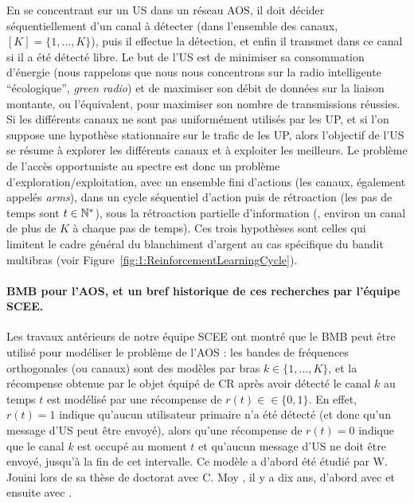\begin{resume_fr}
En se concentrant sur un US dans un réseau AOS, il doit décider séquentiellement d'un canal à détecter (dans l'ensemble des canaux, $[K]=\{1,\dots,K\}$), puis il effectue la détection, et enfin il transmet dans ce canal si il a été détecté libre.
Le but de l'US est de minimiser sa consommation d'énergie (nous rappelons que nous nous concentrons sur la radio intelligente ``écologique'', \emph{green radio}) et de maximiser son débit de données sur la liaison montante, ou l'équivalent, pour maximiser son nombre de transmissions réussies.
%
Si les différents canaux ne sont pas uniformément utilisés par les UP, et si l'on suppose une hypothèse stationnaire sur le trafic de les UP, alors l'objectif de l'US se résume à explorer les différents canaux et à exploiter les meilleurs.
Le problème de l'accès opportuniste au spectre est donc un problème d'exploration/exploitation, avec un ensemble fini d'actions (les canaux, également appelés \emph{arms}),
dans un cycle séquentiel d'action puis de rétroaction (les pas de temps sont $t\in\mathbb{N}^*$),
sous la rétroaction partielle d'information (\ie, environ un canal de plus de $K$ à chaque pas de temps).
Ces trois hypothèses sont celles qui limitent le cadre général du blanchiment d'argent au cas spécifique du bandit multibras (voir Figure~\ref{fig:1:ReinforcementLearningCycle}).


\paragraph{BMB pour l'AOS, et un bref historique de ces recherches par l'équipe SCEE.}
%
Les travaux antérieurs de notre équipe SCEE ont montré que le BMB peut être utilisé pour modéliser le problème de l'AOS :
les bandes de fréquences orthogonales (ou canaux) sont des modèles par bras $k\in\{1,\dots,K\}$,
et la récompense obtenue par le objet équipé de CR après avoir détecté le canal $k$ au temps $t$ est modélisé par une récompense de $r(t) \in \in \{0,1\}$.
En effet, $r(t) = 1$ indique qu'aucun utilisateur primaire n'a été détecté (et donc qu'un message d'US peut être envoyé), alors qu'une récompense de $r(t)=0$ indique que le canal $k$ est occupé au moment $t$ et qu'aucun message d'US ne doit être envoyé, jusqu'à la fin de cet intervalle.
%
Ce modèle a d'abord été étudié par W. Jouini lors de sa thèse de doctorat avec C. Moy \cite{Jouini12PhD}, il y a dix ans, d'abord avec \cite{Jouini09} et ensuite avec \cite{Jouini10,Jouini12}.


\end{resume_fr}
